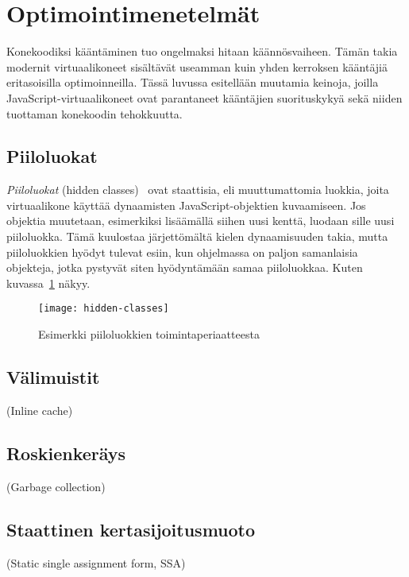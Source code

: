\section{Optimointimenetelmät}

Konekoodiksi kääntäminen tuo ongelmaksi hitaan käännösvaiheen. Tämän takia modernit virtuaalikoneet sisältävät useamman kuin yhden kerroksen kääntäjiä eritasoisilla optimoinneilla. Tässä luvussa esitellään muutamia keinoja, joilla JavaScript-virtuaalikoneet ovat parantaneet kääntäjien suorituskykyä sekä niiden tuottaman konekoodin tehokkuutta.

\subsection{Piiloluokat}

\textit{Piiloluokat} (hidden classes)~\cite{v8design} ovat staattisia, eli muuttumattomia luokkia, joita virtuaalikone käyttää dynaamisten JavaScript-objektien kuvaamiseen. Jos objektia muutetaan, esimerkiksi lisäämällä siihen uusi kenttä, luodaan sille uusi piiloluokka. Tämä kuulostaa järjettömältä kielen dynaamisuuden takia, mutta piiloluokkien hyödyt tulevat esiin, kun ohjelmassa on paljon samanlaisia objekteja, jotka pystyvät siten hyödyntämään samaa piiloluokkaa. Kuten kuvassa~\ref{fig:hiddenclass} näkyy.

\begin{figure}[h]
    \texttt{[image: hidden-classes]}
    \caption{Esimerkki piiloluokkien toimintaperiaatteesta}
     \centering
     \label{fig:hiddenclass}
\end{figure}

\subsection{Välimuistit}

(Inline cache)

\subsection{Roskienkeräys}

(Garbage collection)

\subsection{Staattinen kertasijoitusmuoto}

(Static single assignment form, SSA)